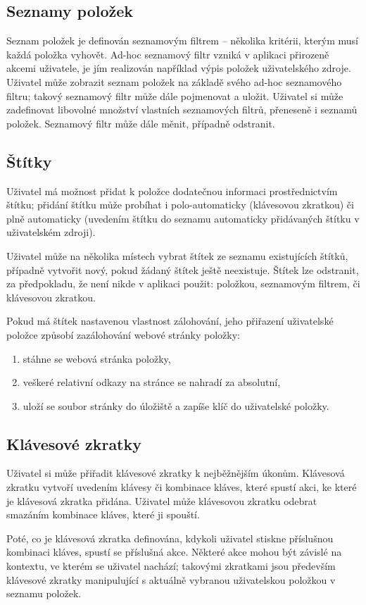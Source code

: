 \subsection{Seznamy položek}

Seznam položek je definován seznamovým filtrem -- několika kritérii, kterým musí každá položka vyhovět.
Ad-hoc seznamový filtr vzniká v aplikaci přirozeně akcemi uživatele, je jím realizován například výpis položek uživatelského zdroje.
Uživatel může zobrazit seznam položek na základě svého ad-hoc seznamového filtru; takový seznamový filtr může dále pojmenovat a uložit.
Uživatel si může zadefinovat libovolné množství vlastních seznamových filtrů, přeneseně i seznamů položek.
Seznamový filtr může dále měnit, případně odstranit.

\subsection{Štítky}

Uživatel má možnost přidat k položce dodatečnou informaci prostřednictvím štítku; přidání štítku může probíhat i polo-automaticky (klávesovou zkratkou) či plně automaticky (uvedením štítku do seznamu automaticky přidávaných štítku v uživatelském zdroji).

Uživatel může na několika místech vybrat štítek ze seznamu existujících štítků, případně vytvořit nový, pokud žádaný štítek ještě neexistuje.
Štítek lze odstranit, za předpokladu, že není nikde v aplikaci použit: položkou, seznamovým filtrem, či klávesovou zkratkou.

Pokud má štítek nastavenou vlastnost zálohování, jeho přiřazení uživatelské položce způsobí zazálohování webové stránky položky:
\begin{enumerate}
	\item stáhne se webová stránka položky,
	\item veškeré relativní odkazy na stránce se nahradí za absolutní,
	\item uloží se soubor stránky do úložiště a zapíše klíč do uživatelské položky.
\end{enumerate}

\subsection{Klávesové zkratky}

Uživatel si může přiřadit klávesové zkratky k nejběžnějším úkonům.
Klávesová zkratku vytvoří uvedením klávesy či kombinace kláves, které spustí akci, ke které je klávesová zkratka přidána.
Uživatel může klávesovou zkratku odebrat smazáním kombinace kláves, které ji spouští.

Poté, co je klávesová zkratka definována, kdykoli uživatel stiskne příslušnou kombinaci kláves, spustí se příslušná akce.
Některé akce mohou být závislé na kontextu, ve kterém se uživatel nachází; takovými zkratkami jsou především klávesové zkratky manipulující s aktuálně vybranou uživatelskou položkou v seznamu položek.
